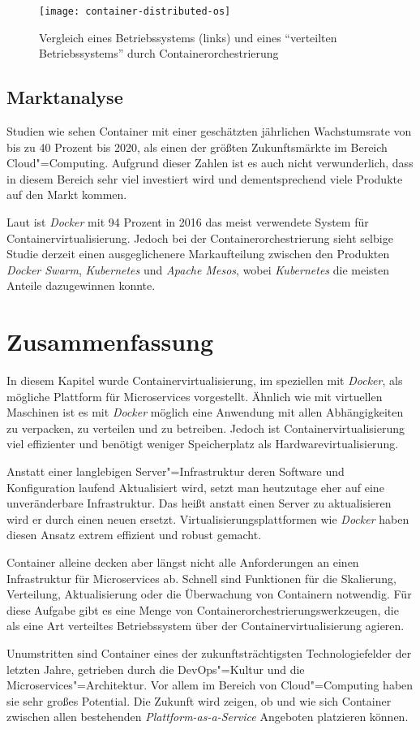 \begin{figure}[!hbt]%
\centering
\texttt{[image: container-distributed-os]}%
\caption{Vergleich eines Betriebssystems (links) und eines "`verteilten Betriebssystems"' durch Containerorchestrierung}%
\label{fig:container-distributed-os}%
\end{figure}

\subsection{Marktanalyse}

Studien wie \cite{ContainerMarketGrowth} sehen Container mit einer geschätzten jährlichen Wachstumsrate von bis zu 40 Prozent bis 2020, als einen der größten Zukunftsmärkte im Bereich Cloud"=Computing. Aufgrund dieser Zahlen ist es auch nicht verwunderlich, dass in diesem Bereich sehr viel investiert wird und dementsprechend viele Produkte auf den Markt kommen. 

Laut \cite{ContainerMarketReport} ist \textit{Docker} mit 94 Prozent in 2016 das meist verwendete System für Containervirtualisierung. Jedoch bei der Containerorchestrierung sieht selbige Studie derzeit einen ausgeglichenere Markaufteilung zwischen den Produkten \textit{Docker Swarm}, \textit{Kubernetes} und \textit{Apache Mesos}, wobei \textit{Kubernetes} die meisten Anteile dazugewinnen konnte.

\section{Zusammenfassung}

In diesem Kapitel wurde Containervirtualisierung, im speziellen mit \textit{Docker}, als mögliche Plattform für Microservices vorgestellt. Ähnlich wie mit virtuellen Maschinen ist es mit \textit{Docker} möglich eine Anwendung mit allen Abhängigkeiten zu verpacken, zu verteilen und zu betreiben. Jedoch ist Containervirtualisierung viel effizienter und benötigt weniger Speicherplatz als Hardwarevirtualisierung.

Anstatt einer langlebigen Server"=Infrastruktur deren Software und Konfiguration laufend Aktualisiert wird, setzt man heutzutage eher auf eine unveränderbare Infrastruktur. Das heißt anstatt einen Server zu aktualisieren wird er durch einen neuen ersetzt. Virtualisierungsplattformen wie \textit{Docker} haben diesen Ansatz extrem effizient und robust gemacht.

Container alleine decken aber längst nicht alle Anforderungen an einen Infrastruktur für Microservices ab. Schnell sind Funktionen für die Skalierung, Verteilung, Aktualisierung oder die Überwachung von Containern notwendig. Für diese Aufgabe gibt es eine Menge von Containerorchestrierungswerkzeugen, die als eine Art verteiltes Betriebssystem über der Containervirtualisierung agieren.

Unumstritten sind Container eines der zukunftsträchtigsten Technologiefelder der letzten Jahre, getrieben durch die DevOps"=Kultur und die Microservices"=Architektur. Vor allem im Bereich von Cloud"=Computing haben sie sehr großes Potential. Die Zukunft wird zeigen, ob und wie sich Container zwischen allen bestehenden \textit{Plattform-as-a-Service} Angeboten platzieren können. 